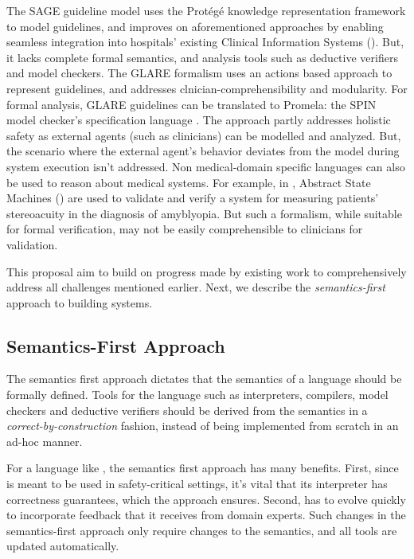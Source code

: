 The SAGE guideline model \cite{TuSAGE04} uses the Prot\'eg\'e knowledge
representation framework \cite{NoyAMIA03} to model guidelines,
and improves on aforementioned approaches by
enabling seamless integration into hospitals' existing Clinical Information Systems
(\CISs). But, it lacks complete formal semantics, and analysis tools
such as deductive verifiers and model checkers.
The GLARE formalism \cite{TerenzianiBook04} uses an actions based approach
to represent guidelines, and addresses clnician-comprehensibility and
modularity. For formal analysis, GLARE guidelines can be translated to
Promela: the SPIN model checker's specification language \cite{GiordanoAMIA06}.
The approach partly addresses holistic safety as
external agents (such as clinicians) can be modelled and analyzed.
But, the scenario where the external agent's behavior
deviates from the model during system execution isn't addressed.
Non medical-domain specific languages can also be used to reason about
medical systems. For example, in \cite{ArcainiMEMCODE15}, Abstract State
Machines (\ASMs) are used to validate and verify a system for measuring
patients' stereoacuity in the diagnosis of amyblyopia. But such a
formalism, while suitable for formal verification, may
not be easily comprehensible to clinicians for validation.

This proposal aim to build on progress made by existing work to comprehensively
address all challenges mentioned earlier. Next, we describe the
\emph{semantics-first} approach to building systems.

\subsection{Semantics-First Approach}

The semantics first approach dictates that the semantics
of a language should be formally defined. Tools for the language
such as interpreters, compilers, model checkers and deductive
verifiers should be derived from the semantics in a
\emph{correct-by-construction} fashion, instead of being implemented
from scratch in an ad-hoc manner.

For a language like \MediK{}, the semantics first approach has many benefits. First,
since \MediK{} is meant to be used in safety-critical settings,
it's vital that its interpreter has correctness guarantees, which
the approach ensures. Second, \MediK{} has to evolve quickly
to incorporate feedback that it receives from domain experts.
Such changes in the semantics-first approach only require changes to
the semantics, and all tools are updated automatically.
